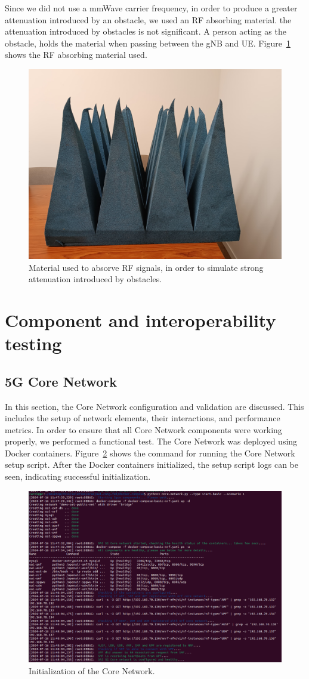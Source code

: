 Since we did not use a mmWave carrier frequency, in order to produce a greater attenuation introduced by an obstacle, we used an RF absorbing material.
 the attenuation introduced by obstacles is not significant.
A person acting as the obstacle, holds the material when passing between the gNB and UE\@.
Figure~\ref{fig:foam} shows the RF absorbing material used.

\begin{figure}[H]
    \centering
    \includegraphics[width=0.5\linewidth]{figures/foam}
    \caption{Material used to absorve RF signals, in order to simulate strong attenuation introduced by obstacles.}
    \label{fig:foam}
\end{figure}



\section{Component and interoperability testing}\label{sec:component-testing}


\subsection{5G Core Network}\label{subsec:core_network}
In this section, the Core Network configuration and validation are discussed.
This includes the setup of network elements, their interactions, and performance metrics.
In order to ensure that all Core Network components were working properly, we performed a functional test.
The Core Network was deployed using Docker containers.
Figure~\ref{fig:core_init} shows the command for running the Core Network setup script.
After the Docker containers initialized, the setup script logs can be seen, indicating successful initialization.

\begin{figure}[H]
    \centering
    \includegraphics[width=0.5\linewidth]{figures/core_init}
    \caption[Initialization of the Core Network]{Initialization of the Core Network.}
    \label{fig:core_init}
\end{figure}

